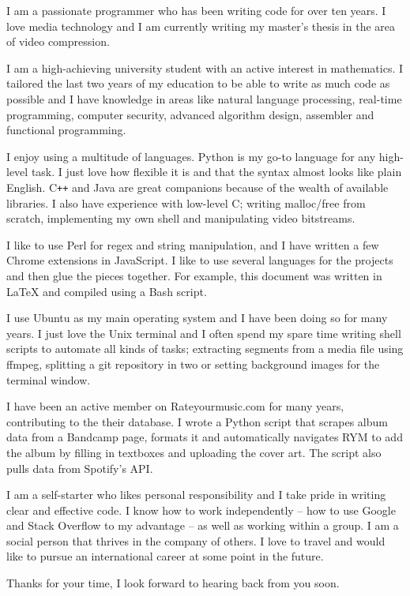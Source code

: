 I am a passionate programmer who has been writing code for over ten years. I love media technology and I am currently writing my master's thesis in the area of video compression.

I am a high-achieving university student with an active interest in mathematics. I tailored the last two years of my education to be able to write as much code as possible and I have knowledge in areas like natural language processing, real-time programming, computer security, advanced algorithm design, assembler and functional programming.

I enjoy using a multitude of languages. Python is my go-to language for any high-level task. I just love how flexible it is and that the syntax almost looks like plain English. C\texttt{++} and Java are great companions because of the wealth of available libraries. I also have experience with low-level C; writing malloc/free from scratch, implementing my own shell and manipulating video bitstreams.

I like to use Perl for regex and string manipulation, and I have written a few Chrome extensions in JavaScript. I like to use several languages for the projects and then glue the pieces together. For example, this document was written in LaTeX and compiled using a Bash script.

I use Ubuntu as my main operating system and I have been doing so for many years. I just love the Unix terminal and I often spend my spare time writing shell scripts to automate all kinds of tasks; extracting segments from a media file using ffmpeg, splitting a git repository in two or setting background images for the terminal window.

I have been an active member on Rateyourmusic.com for many years, contributing to the their database. I wrote a Python script that scrapes album data from a Bandcamp page, formats it and automatically navigates RYM to add the album by filling in textboxes and uploading the cover art. The script also pulls data from Spotify's API.

I am a self-starter who likes personal responsibility and I take pride in writing clear and effective code. I know how to work independently -- how to use Google and Stack Overflow to my advantage -- as well as working within a group. I am a social person that thrives in the company of others. I love to travel and would like to pursue an international career at some point in the future.

Thanks for your time, I look forward to hearing back from you soon.
